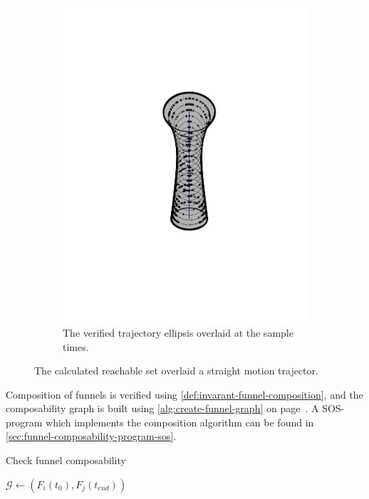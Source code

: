 \begin{figure}
\begin{subfigure}[b]{0.5\textwidth}
    \includegraphics[trim={5cm 5cm 5cm 5cm},
    width=.95\textwidth]{figures/method/funnel-sampled}
    \caption{The verified trajectory ellipsis overlaid at the sample times.}
  \end{subfigure}
  \caption[A funnel overlaid a trajector]{The calculated reachable set overlaid
    a straight motion trajector.}
    \label{fig:funnel-straight-sampled}
\end{figure}

Composition of funnels is verified using \cref{def:invarant-funnel-composition},
and the composability graph is built using \cref{alg:create-funnel-graph} on
page~\pageref{alg:create-funnel-graph}. A \ac{SOS}-program which implements the
composition algorithm can be found in
\cref{sec:funnel-composability-program-sos}.

\begin{algorithm}
  \caption{Check funnel composability}
  \label{alg:create-funnel-graph}
  \DontPrintSemicolon \SetAlgoNoLine


  {  { %
      { \(\mathcal{G} \leftarrow{} \left( F_{i}(t_{0}), F_{j}(t_{end})
        \right)\)%
      }%
    }%
  }
\end{algorithm}

